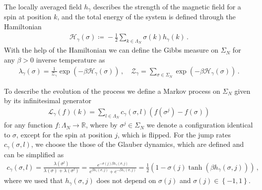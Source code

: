 \documentclass{report}
\newcommand{\RR}{\mathbb{R}}
\DeclareMathOperator{\DefiningEquality}{\coloneqq}
\theoremstyle{remark}
\theoremstyle{definition}
\begin{document}
The locally averaged field $h_\gamma$ describes the strength of the magnetic field for a spin at position $k$, and the total energy of the system is defined through the Hamiltonian \begin{align}
  \mathcal{H}_\gamma(\sigma) \DefiningEquality -\frac{1}{2}\sum_{k\in \Lambda_N} \sigma(k) h_\gamma(k)\,.
\end{align} With the help of the Hamiltonian we can define the Gibbs measure on $\Sigma_N$ for any $\beta > 0$ inverse temperature as \begin{align}
  \lambda_\gamma(\sigma) = \frac{1}{\mathcal{Z}_\gamma}\exp{\left(-\beta \mathcal{H}_\gamma(\sigma)\right)}\,,\quad \mathcal{Z}_\gamma = \sum_{\sigma \in \Sigma_N} \exp{\left(-\beta \mathcal{H}_\gamma(\sigma)\right)}\,.
\end{align}

To describe the evolution of the process we define a Markov process on $\Sigma_N$ given by its infinitesimal generator \begin{align}
  \mathcal{L}_\gamma(f)(k) = \sum_{l \in \Lambda_N} c_\gamma(\sigma, l)(f(\sigma^j) - f(\sigma))
\end{align}
for any function $f: \Lambda_N \to \RR$, where by $\sigma^j \in \Sigma_N$ we denote a configuration identical to $\sigma$, except for the spin at position $j$, which is flipped. For the jump rates $c_\gamma(\sigma, l)$, we choose the those of the Glauber dynamics, which are defined and can be simplified as
\begin{align}
  \label{eq:trig_jump_rates}
  c_\gamma(\sigma, l) = \frac{\lambda(\sigma^l)}{\lambda(\sigma) + \lambda(\sigma^l)} = \frac{e^{-\sigma(j)\beta h_\gamma(\sigma, j)}}{e^{\beta h_\gamma(\sigma, j)} + e^{-\beta h_\gamma(\sigma, j)}} = \frac{1}{2}\left(1 - \sigma(j) \tanh\left(\beta h_\gamma(\sigma, j)\right)\right)\,,
\end{align}
where we used that $h_\gamma(\sigma, j)$ does not depend on $\sigma(j)$ and $\sigma(j) \in \left\{-1, 1\right\}$.
\end{document}
